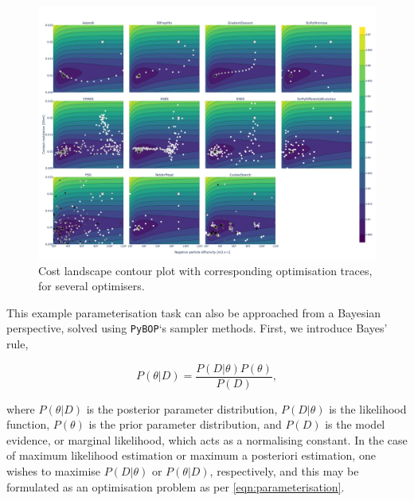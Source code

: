 \documentclass[
]{article}
\begin{document}
\begin{figure}
\centering
\includegraphics[width=1\textwidth,height=\textheight]{figures/joss/contour_subplot.png}
\caption{Cost landscape contour plot with corresponding optimisation
traces, for several optimisers. \label{fig:optimiser-inference2}}
\end{figure}

This example parameterisation task can also be approached from a
Bayesian perspective, solved using \texttt{PyBOP}`s sampler methods.
First, we introduce Bayes' rule,

\begin{equation}
P(\theta|D) = \frac{P(D|\theta)P(\theta)}{P(D)},
\label{eqn:bayes_theorem}
\end{equation}

where \(P(\theta|D)\) is the posterior parameter distribution,
\(P(D|\theta)\) is the likelihood function, \(P(\theta)\) is the prior
parameter distribution, and \(P(D)\) is the model evidence, or marginal
likelihood, which acts as a normalising constant. In the case of maximum
likelihood estimation or maximum a posteriori estimation, one wishes to
maximise \(P(D|\theta)\) or \(P(\theta|D)\), respectively, and this may
be formulated as an optimisation problem as per
\autoref{eqn:parameterisation}.
\end{document}
